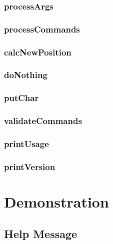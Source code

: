 \documentclass[a4paper, 12pt, titlepage]{article}
\begin{document}
\subsubsection{processArgs}

\subsubsection{processCommands}

\subsubsection{calcNewPosition}

\subsubsection{doNothing}

\subsubsection{putChar}

\subsubsection{validateCommands}

\subsubsection{printUsage}

\subsubsection{printVersion}


\newpage


\section{Demonstration}

\subsection{Help Message}
\end{document}
